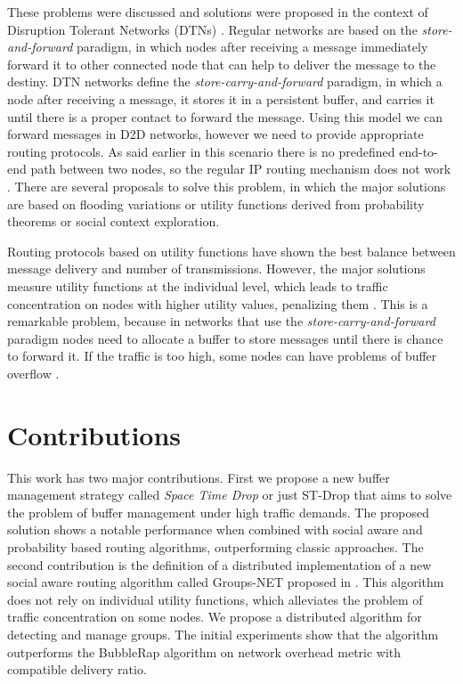 These problems were discussed and solutions were proposed in the context of Disruption Tolerant Networks (DTNs) \citep{fall2003delay}. Regular networks are based on the \textit{store-and-forward} paradigm, in which nodes after receiving a message immediately forward it to other connected node that can help to deliver the message to the destiny. DTN networks define the \textit{store-carry-and-forward} paradigm, in which a node after receiving a message, it stores it in a persistent buffer, and carries it until there is a proper contact to forward the message. Using this model we can forward messages in D2D networks, however we need to provide appropriate routing protocols. As said earlier in this scenario there is no predefined end-to-end path between two nodes, so the regular IP routing mechanism does not work \citep{misra2016opportunistic}. There are several proposals to solve this problem, in which the major solutions are based on flooding variations or utility functions derived from probability theorems or social context exploration.

Routing protocols based on utility functions have shown the best balance between message delivery and number of transmissions. However, the major solutions measure utility functions at the individual level, which leads to traffic concentration on nodes with higher utility values, penalizing them \citep{chilipirea2013energy}. This is a remarkable problem, because in networks that use the \textit{store-carry-and-forward} paradigm nodes need to allocate a buffer to store messages until there is chance to forward it. If the traffic is too high, some nodes can have problems of buffer overflow \citep{silva2015survey}.

\section{Contributions}
\label{sec:intro.objectives}

This work has two major contributions. First we propose a new buffer management strategy called \textit{Space Time Drop} or just ST-Drop that aims to solve the problem of buffer management under high traffic demands. The proposed solution shows a notable performance when combined with social aware and probability based routing algorithms, outperforming classic approaches. The second contribution is the definition of a distributed implementation of a new social aware routing algorithm called Groups-NET proposed in \citep{nunes2016leveraging}. This algorithm does not rely on individual utility functions, which alleviates the problem of traffic concentration on some nodes. We propose a distributed algorithm for detecting and manage groups. The initial experiments show that the algorithm outperforms the BubbleRap algorithm on network overhead metric with compatible delivery ratio.

